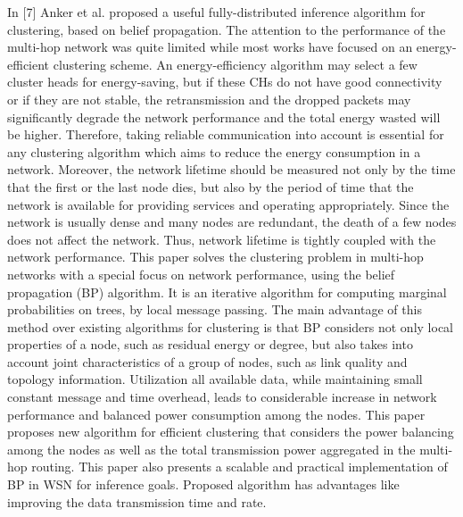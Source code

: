 \documentclass[MTech]{iitmdiss}
\begin{document}
In [7] Anker et al. proposed a useful fully-distributed inference algorithm  for clustering, based on belief propagation. The attention to the performance of the multi-hop network was quite limited while most works  have focused on an energy-efficient clustering scheme. An energy-efficiency algorithm may select a few cluster heads for energy-saving, but if these CHs do not have good connectivity or if they are not stable, the retransmission and the dropped packets may significantly degrade the network
performance and the total energy wasted will be higher. Therefore, taking reliable communication into account is essential for any clustering algorithm which aims to reduce the energy consumption in a network. Moreover, the network lifetime should be measured not only by the time that
the first or the last node dies, but also by the period of time that the network is available for providing services and operating appropriately. Since the network is usually dense and many nodes are redundant, the death of a few nodes does not affect the network. Thus, network lifetime is tightly coupled with the network performance. This paper solves the clustering problem
in multi-hop networks with a special focus on network performance, using the belief propagation (BP) algorithm. It is an iterative algorithm for computing marginal probabilities on trees, by local message passing. The main advantage of this method over existing algorithms for clustering is
that BP considers not only local properties of a node, such as residual energy or degree, but also takes into account joint characteristics of a group of nodes, such as link quality and topology information. Utilization all available data, while maintaining small constant message and time overhead, leads to considerable increase in network performance and balanced power consumption among the nodes. This paper proposes new algorithm for efficient clustering that considers  the power balancing among the nodes as well as  the total transmission power aggregated in the multi-hop routing. This paper also  presents a scalable and practical implementation of BP in WSN for inference goals. Proposed algorithm has advantages like  improving the data transmission time and rate.
\end{document}
